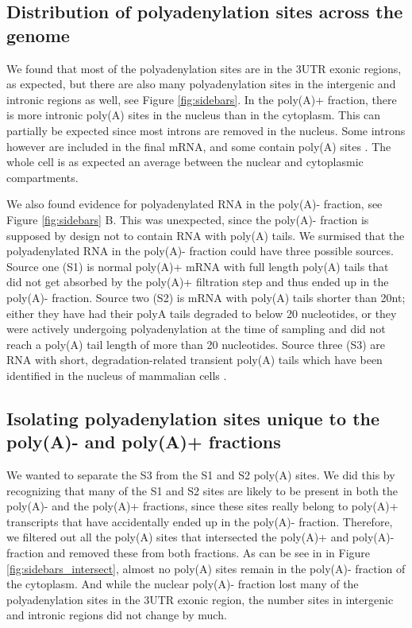 \subsection{Distribution of polyadenylation sites across the genome}
We found that most of the polyadenylation sites are in the 3\p UTR exonic
regions, as expected, but there are also many polyadenylation sites in the
intergenic and intronic regions as well, see Figure \ref{fig:sidebars}. In the
poly(A)+ fraction, there is more intronic poly(A) sites in the nucleus than in
the cytoplasm. This can partially be expected since most introns are removed in
the nucleus. Some introns however are included in the final mRNA, and some
contain poly(A) sites \cite{tian_widespread_2007}. The whole cell is as
expected an average between the nuclear and cytoplasmic compartments.

We also found evidence for polyadenylated RNA in the poly(A)- fraction, see
Figure \ref{fig:sidebars} B. This was unexpected, since the poly(A)- fraction
is supposed by design not to contain RNA with poly(A) tails. We surmised that
the polyadenylated RNA in the poly(A)- fraction could have three possible
sources. Source one (S1) is normal poly(A)+ mRNA with full length poly(A) tails
that did not get absorbed by the poly(A)+ filtration step and thus ended up in
the poly(A)- fraction. Source two (S2) is mRNA with poly(A) tails shorter than
20nt; either they have had their polyA tails degraded to below 20 nucleotides,
or they were actively undergoing polyadenylation at the time of sampling and
did not reach a poly(A) tail length of more than 20 nucleotides. Source three
(S3) are RNA with short, degradation-related transient poly(A) tails which have
been identified in the nucleus of mammalian cells \cite{lemay_nuclear_2010}.

\subsection{Isolating polyadenylation sites unique to the poly(A)- and poly(A)+
fractions}
We wanted to separate the S3 from the S1 and S2 poly(A) sites. We did this by
recognizing that many of the S1 and S2 sites are likely to be present in both
the poly(A)- and the poly(A)+ fractions, since these sites really belong to
poly(A)+ transcripts that have accidentally ended up in the poly(A)- fraction.
Therefore, we filtered out all the poly(A) sites that intersected the poly(A)+
and poly(A)- fraction and removed these from both fractions. As can be see in
in Figure \ref{fig:sidebars_intersect}, almost no poly(A) sites remain in the
poly(A)- fraction of the cytoplasm. And while the nuclear poly(A)- fraction
lost many of the polyadenylation sites in the 3UTR exonic region, the number
sites in intergenic and intronic regions did not change by much.

